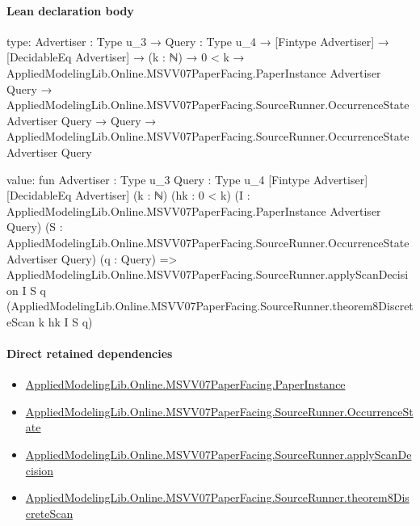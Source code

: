 \documentclass[10pt]{article}
\begin{document}
\paragraph{Lean declaration body}
\begin{ReviewVerbatim}
type:
{Advertiser : Type u_3} →
  {Query : Type u_4} →
    [Fintype Advertiser] →
      [DecidableEq Advertiser] →
        (k : ℕ) →
          0 < k →
            AppliedModelingLib.Online.MSVV07PaperFacing.PaperInstance Advertiser Query →
              AppliedModelingLib.Online.MSVV07PaperFacing.SourceRunner.OccurrenceState Advertiser Query →
                Query → AppliedModelingLib.Online.MSVV07PaperFacing.SourceRunner.OccurrenceState Advertiser Query

value:
fun {Advertiser : Type u_3} {Query : Type u_4} [Fintype Advertiser] [DecidableEq Advertiser] (k : ℕ) (hk : 0 < k)
    (I : AppliedModelingLib.Online.MSVV07PaperFacing.PaperInstance Advertiser Query)
    (S : AppliedModelingLib.Online.MSVV07PaperFacing.SourceRunner.OccurrenceState Advertiser Query) (q : Query) =>
  AppliedModelingLib.Online.MSVV07PaperFacing.SourceRunner.applyScanDecision I S q
    (AppliedModelingLib.Online.MSVV07PaperFacing.SourceRunner.theorem8DiscreteScan k hk I S q)
\end{ReviewVerbatim}

\paragraph{Direct retained dependencies}
\begin{itemize}\raggedright
\item \hyperlink{governing-declaration-11907576ec71eeb5}{Applied\allowbreak{}Modeling\allowbreak{}Lib.\allowbreak{}Online.\allowbreak{}MSVV07\allowbreak{}Paper\allowbreak{}Facing.\allowbreak{}Paper\allowbreak{}Instance}
\item \hyperlink{governing-declaration-2eff7815f49c1d41}{Applied\allowbreak{}Modeling\allowbreak{}Lib.\allowbreak{}Online.\allowbreak{}MSVV07\allowbreak{}Paper\allowbreak{}Facing.\allowbreak{}Source\allowbreak{}Runner.\allowbreak{}Occurrence\allowbreak{}State}
\item \hyperlink{governing-declaration-630634ffcb66c6e1}{Applied\allowbreak{}Modeling\allowbreak{}Lib.\allowbreak{}Online.\allowbreak{}MSVV07\allowbreak{}Paper\allowbreak{}Facing.\allowbreak{}Source\allowbreak{}Runner.\allowbreak{}apply\allowbreak{}Scan\allowbreak{}Decision}
\item \hyperlink{governing-declaration-6cdc2d586a6d4b33}{Applied\allowbreak{}Modeling\allowbreak{}Lib.\allowbreak{}Online.\allowbreak{}MSVV07\allowbreak{}Paper\allowbreak{}Facing.\allowbreak{}Source\allowbreak{}Runner.\allowbreak{}theorem8\allowbreak{}Discrete\allowbreak{}Scan}
\end{itemize}
\hypertarget{governing-declaration-d071ebd3a5ae7962}{}
\end{document}
